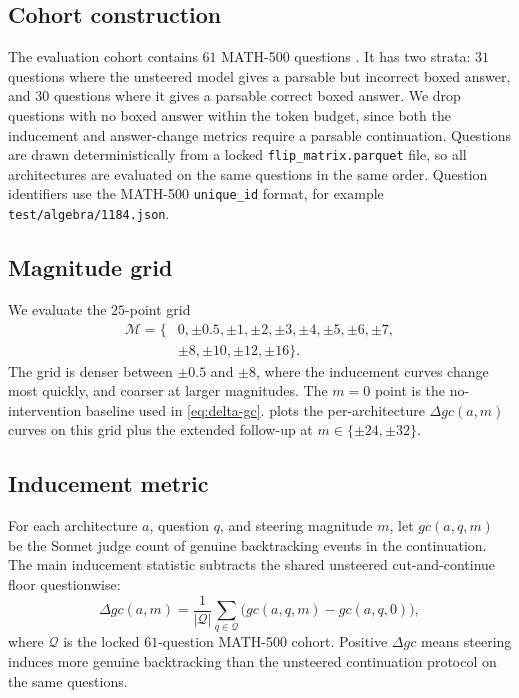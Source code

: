 \subsection{Cohort construction}
\label{app:c7-cohort}

The evaluation cohort contains $61$ MATH-500 questions \cite{hendrycks2021math}. It has two strata: $31$ questions where the unsteered model gives a parsable but incorrect boxed answer, and $30$ questions where it gives a parsable correct boxed answer. We drop questions with no boxed answer within the token budget, since both the inducement and answer-change metrics require a parsable continuation. Questions are drawn deterministically from a locked \texttt{flip\_matrix.parquet} file, so all architectures are evaluated on the same questions in the same order. Question identifiers use the MATH-500 \texttt{unique\_id} format, for example \texttt{test/algebra/1184.json}.

\subsection{Magnitude grid}
\label{app:c7-grid}

We evaluate the $25$-point grid
\[
    \begin{aligned}
    \mathcal{M} = \{&0, \pm0.5, \pm1, \pm2, \pm3, \pm4, \pm5, \pm6, \pm7, \\
                    &\pm8, \pm10, \pm12, \pm16\}.
    \end{aligned}
\]
The grid is denser between $\pm0.5$ and $\pm8$, where the inducement curves change most quickly, and coarser at larger magnitudes. The $m=0$ point is the no-intervention baseline used in \cref{eq:delta-gc}.  plots the per-architecture $\Delta gc(a, m)$ curves on this grid plus the extended follow-up at $m \in \{\pm24, \pm32\}$.

\subsection{Inducement metric}
\label{app:c7-delta-gc}

For each architecture $a$, question $q$, and steering magnitude $m$, let
$gc(a,q,m)$ be the Sonnet judge count of genuine backtracking events in the
continuation. The main inducement statistic subtracts the shared unsteered
cut-and-continue floor questionwise:
\[
    \Delta gc(a,m)
    =
    \frac{1}{|\mathcal Q|}
    \sum_{q\in\mathcal Q}
    \bigl(gc(a,q,m)-gc(a,q,0)\bigr),
    \label{eq:delta-gc}
\]
where $\mathcal Q$ is the locked $61$-question MATH-500 cohort. Positive
$\Delta gc$ means steering induces more genuine backtracking than the unsteered
continuation protocol on the same questions.

